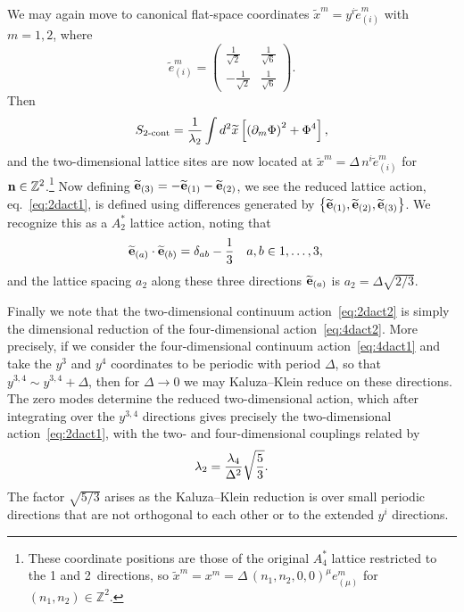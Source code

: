We may again move to canonical flat-space coordinates $\tilde{x}^m = y^i \tilde{e}_{(i)}^m$ with $m = 1, 2$, where
\begin{equation}
  \tilde{e}_{(i)}^m = \left(\begin{array}{cc}
     \frac{1}{\sqrt{2}} & \frac{1}{\sqrt{6}} \\
    -\frac{1}{\sqrt{2}} & \frac{1}{\sqrt{6}}
  \end{array}\right).
\end{equation}
Then
\begin{equation}
  \label{eq:2dact2}
  S_{\text{2-cont}} = \frac{1}{\lambda_2} \int d^2 \widetilde{x} \left[\left(\partial_m \Phi\right)^2 + \Phi^4 \right],
\end{equation}
and the two-dimensional lattice sites are now located at $\tilde{x}^m = \Delta\, n^i \tilde{e}_{(i)}^m$ for $\mathbf{n} \in \mathbb{Z}^2$.\footnote{These coordinate positions are those of the original $A_4^*$ lattice restricted to the 1 and 2~directions, so $\tilde{x}^m = x^m = \Delta\, (n_1, n_2, 0, 0)^{\mu} e_{(\mu)}^m$ for $(n_1, n_2) \in \mathbb{Z}^2$.}
Now defining $\widetilde{\mathbf{e}}_{(3)} = -\widetilde{\mathbf{e}}_{(1)} - \widetilde{\mathbf{e}}_{(2)}$, we see the reduced lattice action, eq.~\eqref{eq:2dact1}, is defined using differences generated by $\left\{\widetilde{\mathbf{e}}_{(1)}, \widetilde{\mathbf{e}}_{(2)}, \widetilde{\mathbf{e}}_{(3)}\right\}$.
We recognize this as a $A_2^*$ lattice action, noting that
\begin{align}
  \widetilde{\mathbf{e}}_{(a)} \cdot \widetilde{\mathbf{e}}_{(b)} & = \delta_{ab} - \frac{1}{3} &
  a, b & \in 1, \ldots, 3,
\end{align}
and the lattice spacing $a_2$ along these three directions $\widetilde{\mathbf{e}}_{(a)}$ is $a_2 = \Delta \sqrt{2 / 3}$.

Finally we note that the two-dimensional continuum action~\eqref{eq:2dact2} is simply the dimensional reduction of the four-dimensional action~\eqref{eq:4dact2}.
More precisely, if we consider the four-dimensional continuum action~\eqref{eq:4dact1} and take the $y^3$ and $y^4$ coordinates to be periodic with period $\Delta$, so that $y^{3, 4} \sim y^{3, 4} + \Delta$, then for $\Delta \to 0$ we may Kaluza--Klein reduce on these directions. 
The zero modes determine the reduced two-dimensional action, which after integrating over the $y^{3, 4}$ directions gives precisely the two-dimensional action~\eqref{eq:2dact1}, with the two- and four-dimensional couplings related by
\begin{equation}
  \label{eq:KKcoupling}
  \lambda_2 = \frac{\lambda_4}{\Delta^2} \sqrt{\frac{5}{3}}. 
\end{equation}
The factor $\sqrt{5 / 3}$ arises as the Kaluza--Klein reduction is over small periodic directions that are not orthogonal to each other or to the extended $y^i$ directions.

